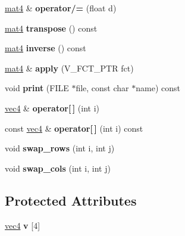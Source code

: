\begin{DoxyCompactItemize}
\item 
\hypertarget{classmat4_a55320554d8728b264026823039736f7f}{\hyperlink{classmat4}{mat4} \& {\bfseries operator/=} (float d)}\label{classmat4_a55320554d8728b264026823039736f7f}

\item 
\hypertarget{classmat4_aab816366c2233c95eac70b2eab11e8e2}{\hyperlink{classmat4}{mat4} {\bfseries transpose} () const }\label{classmat4_aab816366c2233c95eac70b2eab11e8e2}

\item 
\hypertarget{classmat4_a90efa7f6bcd321d1433629c8e6c09af3}{\hyperlink{classmat4}{mat4} {\bfseries inverse} () const }\label{classmat4_a90efa7f6bcd321d1433629c8e6c09af3}

\item 
\hypertarget{classmat4_a2a80b0b0d4ed30044260e4d0c9074caf}{\hyperlink{classmat4}{mat4} \& {\bfseries apply} (V\-\_\-\-F\-C\-T\-\_\-\-P\-T\-R fct)}\label{classmat4_a2a80b0b0d4ed30044260e4d0c9074caf}

\item 
\hypertarget{classmat4_a598ace98030762e74988c34610ac16a6}{void {\bfseries print} (F\-I\-L\-E $\ast$file, const char $\ast$name) const }\label{classmat4_a598ace98030762e74988c34610ac16a6}

\item 
\hypertarget{classmat4_a856496a5770f27f58e19064d27a05722}{\hyperlink{classvec4}{vec4} \& {\bfseries operator\mbox{[}$\,$\mbox{]}} (int i)}\label{classmat4_a856496a5770f27f58e19064d27a05722}

\item 
\hypertarget{classmat4_a58f5742e4149bf369ea0d1d494eb3d98}{const \hyperlink{classvec4}{vec4} \& {\bfseries operator\mbox{[}$\,$\mbox{]}} (int i) const }\label{classmat4_a58f5742e4149bf369ea0d1d494eb3d98}

\item 
\hypertarget{classmat4_ae6d0f4a616207d117712622d7eeab475}{void {\bfseries swap\-\_\-rows} (int i, int j)}\label{classmat4_ae6d0f4a616207d117712622d7eeab475}

\item 
\hypertarget{classmat4_af6a790983e368a25e7fa50679585eab8}{void {\bfseries swap\-\_\-cols} (int i, int j)}\label{classmat4_af6a790983e368a25e7fa50679585eab8}

\end{DoxyCompactItemize}
\subsection*{Protected Attributes}
\begin{DoxyCompactItemize}
\item 
\hypertarget{classmat4_a2ce0e685a8fdc40580a68ce01d8c28e9}{\hyperlink{classvec4}{vec4} {\bfseries v} \mbox{[}4\mbox{]}}\label{classmat4_a2ce0e685a8fdc40580a68ce01d8c28e9}

\end{DoxyCompactItemize}
